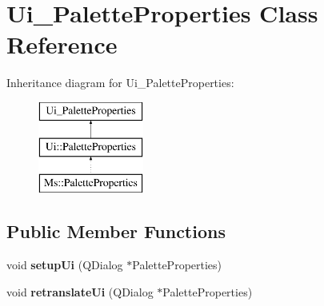 \hypertarget{class_ui___palette_properties}{}\section{Ui\+\_\+\+Palette\+Properties Class Reference}
\label{class_ui___palette_properties}
Inheritance diagram for Ui\+\_\+\+Palette\+Properties\+:\begin{figure}[H]
\begin{center}
\leavevmode
\includegraphics[height=3.000000cm]{class_ui___palette_properties}
\end{center}
\end{figure}
\subsection*{Public Member Functions}
\begin{DoxyCompactItemize}
\item 
\mbox{\label{class_ui___palette_properties_afd14eac31cae9e75946edbe30a1f6a5e}} 
void {\bfseries setup\+Ui} (Q\+Dialog $\ast$Palette\+Properties)
\item 
\mbox{\label{class_ui___palette_properties_a645e8dc783444f7e021a2ee37e8de919}} 
void {\bfseries retranslate\+Ui} (Q\+Dialog $\ast$Palette\+Properties)
\end{DoxyCompactItemize}
